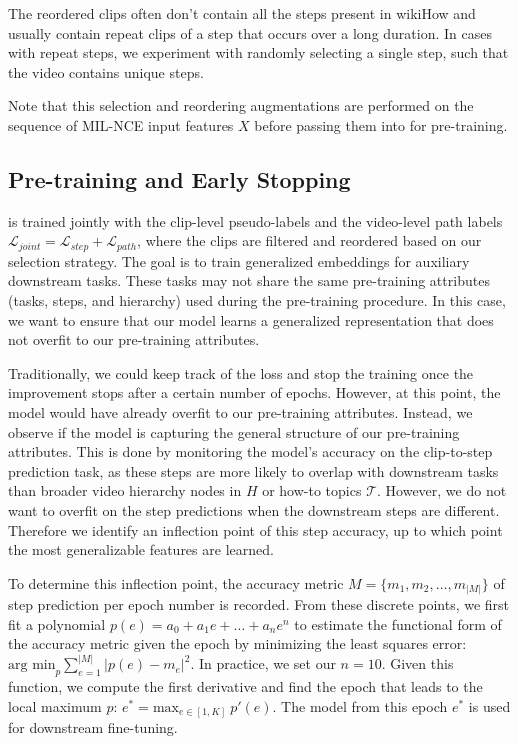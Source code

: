 The reordered clips often don't contain all the steps present in wikiHow and usually contain repeat clips of a step that occurs over a long duration. In cases with repeat steps, we experiment with randomly selecting a single step, such that the video contains unique steps.

Note that this selection and reordering augmentations are performed on the sequence of MIL-NCE input features $X$ before passing them into \model{} for pre-training. 

\subsection{Pre-training and Early Stopping}

\model{} is trained jointly with the clip-level pseudo-labels and the video-level path labels $\mathcal{L}_{joint} = \mathcal{L}_{step} + \mathcal{L}_{path}$, where the clips are filtered and reordered based on our selection strategy. The goal is to train generalized embeddings for auxiliary downstream tasks. These tasks may not share the same pre-training attributes (tasks, steps, and hierarchy) used during the pre-training procedure. In this case, we want to ensure that our model learns a generalized representation that does not overfit to our pre-training attributes.

Traditionally, we could keep track of the loss and stop the training once the improvement stops after a certain number of epochs. However, at this point, the model would have already overfit to our pre-training attributes. Instead, we observe if the model is capturing the general structure of our pre-training attributes. This is done by monitoring the model's accuracy on the clip-to-step prediction task, as these steps are more likely to overlap with downstream tasks than broader video hierarchy nodes in $H$ or how-to topics $\mathcal{T}$. 
However, we do not want to overfit on the step predictions when the downstream steps are different. Therefore we identify an inflection point of this step accuracy, up to which point the most generalizable features are learned. 

To determine this inflection point, the accuracy metric $M = \{m_1, m_2, \dots, m_{|M|}\}$ of step prediction per epoch number is recorded. From these discrete points, we first fit a polynomial $p(e) = a_0 + a_1 e + \dots + a_n e^n$ to estimate the functional form of the accuracy metric given the epoch by minimizing the least squares error: $\text{arg min}_p \sum_{e=1}^{|M|} |p(e) - m_e|^2$. In practice, we set our $n=10$. Given this function, we compute the first derivative and find the epoch that leads to the local maximum $p$: $e^* = \text{max}_{e \in [1, K]}\ p'(e)$. The model from this epoch $e^*$ is used for downstream fine-tuning. 

